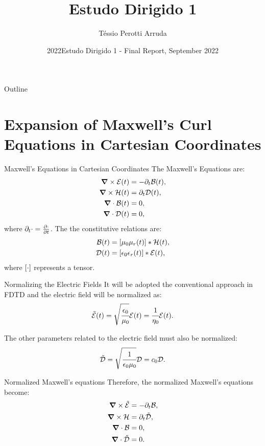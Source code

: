\documentclass[aspectratio=169]{beamer}
\title{Estudo Dirigido 1}
\author{Téssio Perotti Arruda}
\institute{UnB}
\date{2022}
\institute[UnB] %
{
  \inst{1}%
  Electrical Engineering\\
  University of Brasilia
}
\date[ED1 2022.1] %
{Estudo Dirigido 1 - Final Report, September 2022}
\begin{document}
\frame{\titlepage}

\begin{frame}{Outline}
  \tableofcontents
\end{frame}


\section{Expansion of Maxwell's Curl Equations in Cartesian Coordinates}

\begin{frame}{Maxwell's Equations in Cartesian Coordinates}
The Maxwell's Equations are:
\begin{align*}
    \bm{\nabla}\times \mathcal{E}(t) &= -\partial _t \mathcal{B}(t), \\
    \bm{\nabla}\times \mathcal{H}(t) &= \partial_t \mathcal{D}(t), \\
    \bm{\nabla}\cdot \mathcal{B}(t) &= 0, \\
    \bm{\nabla}\cdot \mathcal{D}(t) &= 0,
\end{align*}
where $\partial_t\cdot = \frac{\partial \cdot}{\partial t}$.
The the constitutive relations are:
\begin{align}
    \Bt(t) &= \brackets{\mu_0\mu_r  (t)} \ast \Hht(t), \\
    \Dt(t) &= \brackets{\epsilon_0 \epsilon_r  (t)} \ast \Et(t),
\end{align}
where $\brackets{\cdot}$ represents a tensor.
\end{frame}


\begin{frame}{Normalizing the Electric Fields}
  It will be adopted the conventional approach in FDTD and the electric field will be normalized as:
  \begin{equation}
    \tilde{\mathcal{E}}(t) = \sqrt{\cfrac{\epsilon_0}{\mu_0}}\mathcal{E}(t) = \cfrac{1}{\eta_0}\mathcal{E}(t).
  \end{equation}

  The other parameters related to the electric field must also be normalized:
  \begin{equation}
      \tilde{\mathcal{D}} = \sqrt{\cfrac{1}{\epsilon_0\mu_0}} \mathcal{D} = c_0 \mathcal{D}.
  \end{equation}

\end{frame}

\begin{frame}{Normalized Maxwell's equations}
  Therefore, the normalized Maxwell's equations become:
  \begin{align}
      \bm{\nabla}\times \tilde{\mathcal{E}} &= -\partial _t \mathcal{B}, \\
      \bm{\nabla}\times \mathcal{H} &= \partial_t \tilde{\mathcal{D}}, \\
      \bm{\nabla}\cdot \mathcal{B} &= 0, \\
      \bm{\nabla}\cdot \tilde{\mathcal{D}} &= 0.
  \end{align}
\end{frame}
\end{document}
